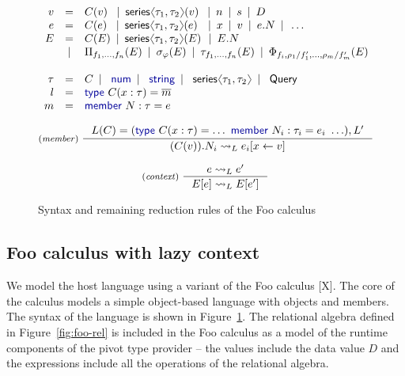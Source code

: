 \documentclass[a4paper,UKenglish]{lipics-v2016}
\theoremstyle{plain}
\theoremstyle{definition}
\newcommand{\langl}{\begin{picture}(4.5,7)
\put(1.1,2.5){\rotatebox{60}{\line(1,0){5.5}}}
\put(1.1,2.5){\rotatebox{300}{\line(1,0){5.5}}}
\end{picture}}
\newcommand{\rangl}{\begin{picture}(4.5,7)
\put(.9,2.5){\rotatebox{120}{\line(1,0){5.5}}}
\put(.9,2.5){\rotatebox{240}{\line(1,0){5.5}}}
\end{picture}}
\newcommand{\lsep}{~\,|\,~}
\newcommand{\kvd}[1]{\textnormal{\textcolor{kvdclr}{\sffamily #1}}}
\newcommand{\ident}[1]{\textnormal{\sffamily #1}}
\begin{document}
\begin{figure}
\begin{equation*}
\begin{array}{rcl}
  v &=& C(v)\,\, \lsep \ident{series}\langl \tau_1, \tau_2 \rangl(v)\; \lsep n \lsep s \lsep D \\
  e &=& C(e)\,\, \lsep \ident{series}\langl \tau_1, \tau_2 \rangl(e)\;\, \lsep x \lsep v \lsep e.N \lsep \ldots\\
  E &=& C(E) \lsep \ident{series}\langl \tau_1, \tau_2 \rangl(E)\, \lsep E.N \\
    &|& \Pi_{f_1, \ldots, f_n}(E) \lsep \sigma_\varphi(E) \lsep \tau_{f_1, \ldots, f_n}(E) \lsep \Phi_{f_i, \rho_1/f_1', \ldots, \rho_m/f_m'} (E) \\
    \\
 \tau &=& C \lsep \kvd{num} \lsep \kvd{string} \lsep \ident{series}\langl \tau_1, \tau_2 \rangl \lsep \ident{Query}\\
 l &=& \kvd{type}~C(x:\tau) = \overline{m} \\
 m &=& \kvd{member}~N:\tau= e
\end{array}
\end{equation*}
\vspace{-1em}

\[
\inference[(\emph{member})~]
{ L(C) = (\kvd{type}~C(x:\tau)= \ldots~\kvd{member}~N_i : \tau_i = e_i~\ldots), L'}
{ (C(v)).N_i \leadsto_L e_i[x \leftarrow v] }\\
\]
\vspace{-2.5em}

\[
\inference[(\emph{context})~]
{e \leadsto_L e'}
{E[e] \leadsto_L E[e']}
\]

\caption{Syntax and remaining reduction rules of the Foo calculus}
\label{fig:foo-syntax}
\end{figure}


\subsection{Foo calculus with lazy context}
\label{sec:foo-foo}

We model the host language using a variant of the Foo calculus [X]. The core of the calculus models
a simple object-based language with objects and members. The syntax of the language is shown in
Figure~\ref{fig:foo-syntax}. The relational algebra defined in Figure~\ref{fig:foo-rel} is included
in the Foo calculus as a model of the runtime components of the pivot type provider -- the values
include the data value $D$ and the expressions include all the operations of the relational algebra.
\end{document}
